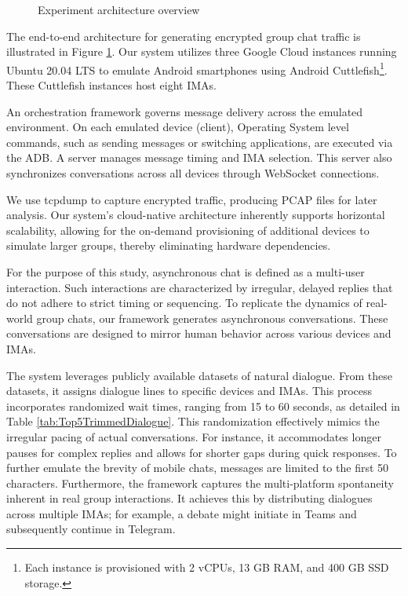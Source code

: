 \documentclass[conference]{IEEEtran}
\begin{document}
\begin{figure}[!ht]
    \caption{Experiment architecture overview}
    \label{fig:architecture}
\end{figure}
The end-to-end architecture for generating encrypted group chat traffic is illustrated in Figure \ref{fig:architecture}. Our system utilizes three Google Cloud instances running Ubuntu 20.04 LTS to emulate Android smartphones using Android Cuttlefish\footnote{Each instance is provisioned with 2 vCPUs, 13 GB RAM, and 400 GB SSD storage.}. These Cuttlefish instances host eight IMAs.

An orchestration framework governs message delivery across the emulated environment. On each emulated device (client), Operating System level commands, such as sending messages or switching applications, are executed via the ADB. A server manages message timing and IMA selection. This server also synchronizes conversations across all devices through WebSocket connections.

We use tcpdump to capture encrypted traffic, producing PCAP files for later analysis. Our system's cloud-native architecture inherently supports horizontal scalability, allowing for the on-demand provisioning of additional devices to simulate larger groups, thereby eliminating hardware dependencies.

For the purpose of this study, asynchronous chat is defined as a multi-user interaction. Such interactions are characterized by irregular, delayed replies that do not adhere to strict timing or sequencing. To replicate the dynamics of real-world group chats, our framework generates asynchronous conversations. These conversations are designed to mirror human behavior across various devices and IMAs.

The system leverages publicly available datasets of natural dialogue. From these datasets, it assigns dialogue lines to specific devices and IMAs. This process incorporates randomized wait times, ranging from 15 to 60 seconds, as detailed in Table \ref{tab:Top5TrimmedDialogue}. This randomization effectively mimics the irregular pacing of actual conversations. For instance, it accommodates longer pauses for complex replies and allows for shorter gaps during quick responses. To further emulate the brevity of mobile chats, messages are limited to the first 50 characters.
Furthermore, the framework captures the multi-platform spontaneity inherent in real group interactions. It achieves this by distributing dialogues across multiple IMAs; for example, a debate might initiate in Teams and subsequently continue in Telegram.
\end{document}
